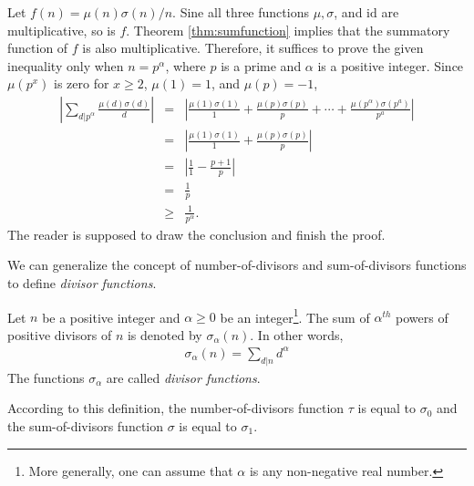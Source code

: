 \documentclass[12pt]{subfile}
\begin{document}
	\begin{solution}
		Let $f(n)=\mu(n)\sigma(n)/n$. Sine all three functions $\mu, \sigma$, and $\text{id}$ are multiplicative, so is $f$. Theorem \ref{thm:sumfunction} implies that the summatory function of $f$ is also multiplicative. Therefore, it suffices to prove the given inequality only when $n=p^\alpha$, where $p$ is a prime and $\alpha$ is a positive integer. Since $\mu(p^x)$ is zero for $x \geq 2$, $\mu(1)=1$, and $\mu(p)=-1$,
			\begin{eqnarray*}
				\left|\sum_{d|p^\alpha}\frac{\mu(d)\sigma(d)}{d}\right|
						&=& \left|\frac{\mu(1)\sigma(1)}{1} + \frac{\mu(p)\sigma(p)}{p} + \cdots + \frac{\mu(p^\alpha)\sigma(p^a)}{p^a}\right| \\
						&=& \left|\frac{\mu(1)\sigma(1)}{1} + \frac{\mu(p)\sigma(p)}{p}\right|\\
						&=& \left|\frac{1}{1} - \frac{p+1}{p}\right|\\
						&=& \frac{1}{p}\\
						&\geq& \frac{1}{p^\alpha}.
			\end{eqnarray*}
		The reader is supposed to draw the conclusion and finish the proof.
	\end{solution}



We can generalize the concept of number-of-divisors and sum-of-divisors functions to define \textit{divisor functions}.

	\begin{definition}
		Let $n$ be a positive integer and $\alpha \geq 0$ be an integer\footnote{More generally, one can assume that $\alpha$ is any non-negative real number.}. The sum of $\alpha^{th}$ powers of positive divisors of $n$ is denoted by $\sigma_\alpha(n)$. In other words,
			\begin{align*}
				\sigma_\alpha(n) = \sum_{d|n} d^\alpha
			\end{align*}
		The functions $\sigma_\alpha$ are called \textit{divisor functions}.
	\end{definition}

According to this definition, the number-of-divisors function $\tau$ is equal to $\sigma_0$ and the sum-of-divisors function $\sigma$ is equal to $\sigma_1$.
\end{document}
